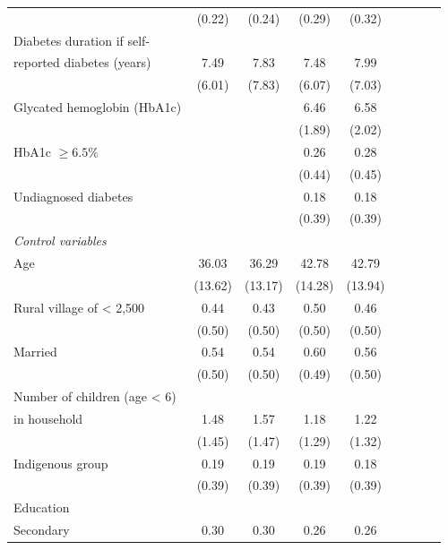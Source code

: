 \documentclass[12pt,english]{article}
\begin{document}
\begin{table}[p]
\begin{adjustbox}{max width=0.7\linewidth, center}
\begin{threeparttable}
{\begin{tabular}{l*{4}{SS}}
					&      (0.22)&      (0.24)&      (0.29)&      (0.32)\\
					Diabetes duration if self- &&&&\\
					reported diabetes (years)   &        7.49&        7.83&        7.48&        7.99\\
					&      (6.01)&      (7.83)&      (6.07)&      (7.03)\\
					Glycated hemoglobin (HbA1c)&            &            &       6.46&        6.58\\
					&            &            &      (1.89)&      (2.02)\\
					HbA1c $\geq 6.5\%$  &            &            &        0.26&        0.28\\
					&            &            &      (0.44)&      (0.45)\\
					Undiagnosed diabetes&            &            &        0.18&        0.18\\
					&            &            &      (0.39)&      (0.39)\\
					\hspace*{10mm}\emph{Control variables} \\
					Age                 &       36.03&       36.29&       42.78&       42.79\\
					&     (13.62)&     (13.17)&     (14.28)&     (13.94)\\
					Rural village of < 2,500&        0.44&        0.43&        0.50&        0.46\\
					&      (0.50)&      (0.50)&      (0.50)&      (0.50)\\
					Married             &        0.54&        0.54&        0.60&        0.56\\
					&      (0.50)&      (0.50)&      (0.49)&      (0.50)\\
					Number of children (age < 6) &&&&\\
					in household&        1.48&        1.57&        1.18&        1.22\\
					&      (1.45)&      (1.47)&      (1.29)&      (1.32)\\
					Indigenous group    &        0.19&        0.19&        0.19&        0.18\\
					&      (0.39)&      (0.39)&      (0.39)&      (0.39)\\
					Education &&&& \\                    
					\hspace*{10mm}Secondary           &        0.30&        0.30&        0.26&        0.26\\

\end{tabular}}
\end{threeparttable}
\end{adjustbox}
\end{table}
\end{document}
